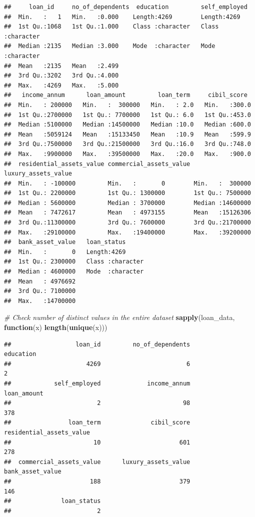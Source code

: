 \documentclass[
]{article}
\newenvironment{Shaded}{\begin{snugshade}}{\end{snugshade}}
\newcommand{\CommentTok}[1]{\textcolor[rgb]{0.56,0.35,0.01}{\textit{#1}}}
\newcommand{\ControlFlowTok}[1]{\textcolor[rgb]{0.13,0.29,0.53}{\textbf{#1}}}
\newcommand{\FunctionTok}[1]{\textcolor[rgb]{0.13,0.29,0.53}{\textbf{#1}}}
\newcommand{\NormalTok}[1]{#1}
\begin{document}
\begin{verbatim}
##     loan_id     no_of_dependents  education         self_employed     
##  Min.   :   1   Min.   :0.000    Length:4269        Length:4269       
##  1st Qu.:1068   1st Qu.:1.000    Class :character   Class :character  
##  Median :2135   Median :3.000    Mode  :character   Mode  :character  
##  Mean   :2135   Mean   :2.499                                         
##  3rd Qu.:3202   3rd Qu.:4.000                                         
##  Max.   :4269   Max.   :5.000                                         
##   income_annum      loan_amount         loan_term     cibil_score   
##  Min.   : 200000   Min.   :  300000   Min.   : 2.0   Min.   :300.0  
##  1st Qu.:2700000   1st Qu.: 7700000   1st Qu.: 6.0   1st Qu.:453.0  
##  Median :5100000   Median :14500000   Median :10.0   Median :600.0  
##  Mean   :5059124   Mean   :15133450   Mean   :10.9   Mean   :599.9  
##  3rd Qu.:7500000   3rd Qu.:21500000   3rd Qu.:16.0   3rd Qu.:748.0  
##  Max.   :9900000   Max.   :39500000   Max.   :20.0   Max.   :900.0  
##  residential_assets_value commercial_assets_value luxury_assets_value
##  Min.   : -100000         Min.   :       0        Min.   :  300000   
##  1st Qu.: 2200000         1st Qu.: 1300000        1st Qu.: 7500000   
##  Median : 5600000         Median : 3700000        Median :14600000   
##  Mean   : 7472617         Mean   : 4973155        Mean   :15126306   
##  3rd Qu.:11300000         3rd Qu.: 7600000        3rd Qu.:21700000   
##  Max.   :29100000         Max.   :19400000        Max.   :39200000   
##  bank_asset_value   loan_status       
##  Min.   :       0   Length:4269       
##  1st Qu.: 2300000   Class :character  
##  Median : 4600000   Mode  :character  
##  Mean   : 4976692                     
##  3rd Qu.: 7100000                     
##  Max.   :14700000
\end{verbatim}

\begin{Shaded}
\begin{Highlighting}[]
\CommentTok{\# Check number of distinct values in the entire dataset}
\FunctionTok{sapply}\NormalTok{(loan\_data, }\ControlFlowTok{function}\NormalTok{(x) }\FunctionTok{length}\NormalTok{(}\FunctionTok{unique}\NormalTok{(x)))}
\end{Highlighting}
\end{Shaded}

\begin{verbatim}
##                  loan_id         no_of_dependents                education 
##                     4269                        6                        2 
##            self_employed             income_annum              loan_amount 
##                        2                       98                      378 
##                loan_term              cibil_score residential_assets_value 
##                       10                      601                      278 
##  commercial_assets_value      luxury_assets_value         bank_asset_value 
##                      188                      379                      146 
##              loan_status 
##                        2
\end{verbatim}
\end{document}
